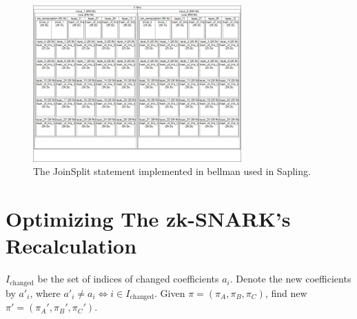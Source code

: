 \documentclass{article}
\begin{document}
\begin{figure}[t]
\includegraphics[width=8cm]{images/joinsplit-groth16-circuit.jpeg}
\caption{The JoinSplit statement implemented in bellman used in Sapling.} \label{fig:joinsplit-circuit}
\centering
\end{figure}

\section{Optimizing The zk-SNARK's Recalculation}

$I_\text{changed}$ be the set of indices of changed coefficients $a_i$.
Denote the new coefficients by $a'_i$, where $a'_i \neq a_i \iff i \in I_\text{changed}$.
Given $\pi = (\pi_A, \pi_B, \pi_C)$, find new $\pi' = (\pi_A', \pi_B', \pi_C')$.
\end{document}
